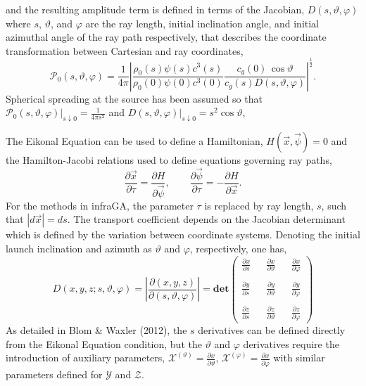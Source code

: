 \documentclass[10pt]{article}
\begin{document}
and the resulting amplitude term is defined in terms of the Jacobian, \(D \left( s, \vartheta, \varphi \right)\) where \(s\), \(\vartheta\), and \(\varphi\) are the ray length, initial inclination angle, and initial azimuthal angle of the ray path respectively, that describes the coordinate transformation between Cartesian and ray coordinates, 
\begin{equation}
  \mathcal{P}_0 \left( s, \vartheta, \varphi \right) = \frac{1}{4 \pi} \left| \frac{\rho_0 \left( s \right) \psi \left( s \right) c^3 \left( s \right)}{\rho_0 \left( 0 \right) \psi \left( 0 \right) c^3 \left( 0 \right)} \frac{c_g \left( 0 \right) \,  \cos \vartheta}{c_g \left( s \right) D \left( s, \vartheta, \varphi \right) } \right|^\frac{1}{2}.
\end{equation}
Spherical spreading at the source has been assumed so that \(\mathcal{P}_0 \left( s, \vartheta, \varphi \right)|_{s \downarrow 0} = \frac{1}{4\pi s^2}\) and \(D \left( s, \vartheta, \varphi \right)|_{s \downarrow 0} = s^2 \cos \vartheta \), 

The Eikonal Equation can be used to define a Hamiltonian, \(  H \left( \vec{x}, \vec{\psi} \right) = 0 \) and the Hamilton-Jacobi relations used to define equations governing ray paths,
 \begin{equation}
 \label{Eq:EikonalHamiltonJacobi:DEs}
  \frac{\partial \vec{x}}{\partial \tau} = \frac{\partial H}{\partial \vec{\psi}}, \quad \quad
  \frac{\partial \vec{\psi}}{\partial \tau} = - \frac{\partial H}{\partial \vec{x}}.
 \end{equation}
 For the methods in infraGA, the parameter \(\tau\) is replaced by ray length, \(s\), such that \(\left| d \vec{x} \right| = ds \).  The transport coefficient depends on the Jacobian determinant which is defined by the variation between coordinate systems.  Denoting the initial launch inclination and azimuth as \(\vartheta\) and \(\varphi\), respectively, one has,
 \begin{equation}
 D \left( x, y, z; s, \vartheta, \varphi \right) = \left| \frac{\partial \left( x, y, z \right)}{\partial \left( s, \vartheta, \varphi \right)} \right| = 
\textbf{det} \begin{pmatrix}
  \frac{\partial x}{\partial s} && \frac{\partial x}{\partial \vartheta} && \frac{\partial x}{\partial \varphi} \\ \\
  \frac{\partial y}{\partial s} && \frac{\partial y}{\partial \vartheta} && \frac{\partial y}{\partial \varphi} \\ \\
  \frac{\partial z}{\partial s} && \frac{\partial z}{\partial \vartheta} && \frac{\partial z}{\partial \varphi}
 \end{pmatrix} 
 \end{equation}
  As detailed in Blom \& Waxler (2012), the \(s\) derivatives can be defined directly from the Eikonal Equation condition, but the \(\vartheta\) and \(\varphi\) derivatives require the introduction of auxiliary parameters, \(\mathcal{X}^{(\vartheta)} = \frac{\partial x}{\partial \vartheta}\), \(\mathcal{X}^{(\varphi)} = \frac{\partial x}{\partial \varphi}\) with similar parameters defined for \(\mathcal{Y}\) and \(\mathcal{Z}\).
\end{document}
